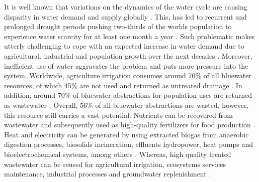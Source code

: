 

It is well known that variations on the dynamics of the water cycle are causing disparity in water demand and supply globally \cite{FAO2015,unescoWastewaterUntappedResource2017}. This, has led to recurrent and prolonged drought periods pushing two-thirds of the worlds population to experience water scarcity for at least one month a year \cite{Mekonnene1500323}. Such problematic makes utterly challenging to cope with an expected increase in water demand due to agricultural, industrial and population growth over the next decades \cite{IFPRI2017}. Moreover, inefficient use of water aggravates the problem and puts more pressure into the system. Worldwide, agriculture irrigation consumes around 70\% of all bluewater resources, of which 45\% are not used and returned as untreated drainage \cite{unescoWastewaterUntappedResource2017}. In addition, around 70\% of bluewater abstractions for population uses are returned as wastewater \cite{unescoWastewaterUntappedResource2017}. Overall, 56\% of all bluewater abstractions are wasted, however, this resource still carries a vast potential. Nutrients can be recovered from wastewater and subsequently used as high-quality fertilizers for food production \cite{moEnergyNutrientsWater2013a}. Heat and electricity can be generated by using extracted biogas from anaerobic digestion processes, biosolids incineration, effluents hydropower, heat pumps and bioelectrochemical systems, among others \cite{moEnergyNutrientsWater2013a}. Whereas, high quality treated wastewater can be reused for agricultural irrigation, ecosystems services maintenance, industrial processes and groundwater replenishment \cite{moEnergyNutrientsWater2013a}.

